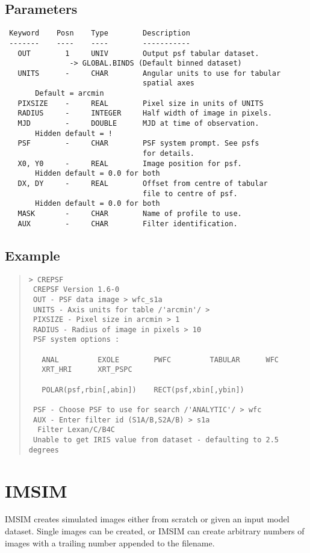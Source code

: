 \documentclass{book}
\renewcommand{\_}{{\tt\char'137}}     %
\begin{document}
\subsection{Parameters}
\begin{verbatim}
 Keyword    Posn    Type        Description
 -------    ----    ----        -----------
   OUT        1     UNIV        Output psf tabular dataset.
               -> GLOBAL.BINDS (Default binned dataset)
   UNITS      -     CHAR        Angular units to use for tabular
                                spatial axes
       Default = arcmin
   PIXSIZE    -     REAL        Pixel size in units of UNITS
   RADIUS     -     INTEGER     Half width of image in pixels.
   MJD        -     DOUBLE      MJD at time of observation.
       Hidden default = !
   PSF        -     CHAR        PSF system prompt. See psfs
                                for details.
   X0, Y0     -     REAL        Image position for psf.
       Hidden default = 0.0 for both
   DX, DY     -     REAL        Offset from centre of tabular
                                file to centre of psf.
       Hidden default = 0.0 for both
   MASK       -     CHAR        Name of profile to use.
   AUX        -     CHAR        Filter identification.

\end{verbatim}\subsection{Example}
\begin{quote}\begin{verbatim}
> CREPSF
 CREPSF Version 1.6-0
 OUT - PSF data image > wfc_s1a
 UNITS - Axis units for table /'arcmin'/ >
 PIXSIZE - Pixel size in arcmin > 1
 RADIUS - Radius of image in pixels > 10
 PSF system options :

   ANAL         EXOLE        PWFC         TABULAR      WFC
   XRT_HRI      XRT_PSPC

   POLAR(psf,rbin[,abin])    RECT(psf,xbin[,ybin])

 PSF - Choose PSF to use for search /'ANALYTIC'/ > wfc
 AUX - Enter filter id (S1A/B,S2A/B) > s1a
  Filter Lexan/C/B4C
 Unable to get IRIS value from dataset - defaulting to 2.5 degrees
 \end{verbatim}\end{quote}
\section{IMSIM}
IMSIM creates simulated images either from scratch or given an input
model dataset. Single images can be created, or IMSIM can create
arbitrary numbers of images with a trailing number appended to the
filename.
\end{document}
